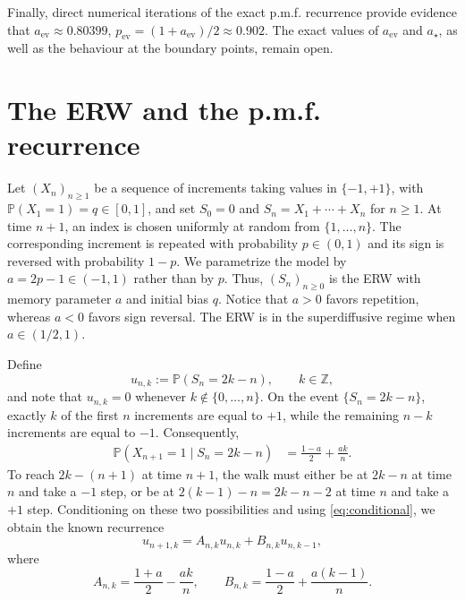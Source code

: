 \documentclass[11pt]{article}
\numberwithin{equation}{section}
\theoremstyle{remark}
\newcommand{\Pp}{\mathbb{P}}
\newcommand{\Z}{\mathbb{Z}}
\begin{document}
Finally, direct numerical iterations of the exact p.m.f. recurrence
provide evidence that $a_{\mathrm{ev}}\approx0.80399$, $p_{\mathrm{ev}}=(1+a_{\mathrm{ev}})/2\approx0.902$. The exact values of $a_{\mathrm{ev}}$ and $a_\star$, as well as the behaviour at the boundary points, remain open.

\section{The ERW and the p.m.f. recurrence}

Let $(X_n)_{n\geq1}$ be a sequence of increments taking values in $\{-1,+1\}$, with $\Pp(X_1=1)=q\in[0,1]$, 
and set $S_0=0$ and $S_n=X_1+\cdots+X_n$ for $n\geq1$. At time $n+1$, an index is chosen uniformly at random from $\{1,\ldots,n\}$. The corresponding increment is repeated with probability $p\in(0,1)$ and its sign is reversed with probability $1-p$. We parametrize the model by $a=2p-1\in(-1,1)$ rather than by $p$. Thus, $(S_n)_{n\geq0}$ is the ERW with memory parameter $a$ and initial bias $q$. Notice that $a>0$ favors repetition, whereas $a<0$ favors sign reversal. The ERW is in the superdiffusive regime when $a\in(1/2,1)$.


Define
\[
u_{n,k}:=\Pp(S_n=2k-n),\qquad k\in\Z,
\]
and note that $u_{n,k}=0$ whenever $k\notin\{0,\ldots,n\}$.
On the event $\{S_n=2k-n\}$, exactly $k$ of the first $n$
increments are equal to $+1$, while the remaining $n-k$ increments
are equal to $-1$. Consequently,
\begin{equation}\label{eq:conditional}
\begin{aligned}
\Pp(X_{n+1}=1\mid S_n=2k-n)
   &=\frac{1-a}{2}+\frac{ak}{n}.
\end{aligned}
\end{equation}
To reach $2k-(n+1)$ at time $n+1$, the walk must either be at
$2k-n$ at time $n$ and take a $-1$ step, or be at
$2(k-1)-n=2k-n-2$ at time $n$ and take a $+1$ step. Conditioning on these two possibilities and using \eqref{eq:conditional}, we obtain the known
recurrence
\begin{equation}\label{eq:massrec}
u_{n+1,k}
=
A_{n,k}u_{n,k}
+
B_{n,k}u_{n,k-1},
\end{equation}
where
\begin{equation}\label{eq:coefficients}
A_{n,k}
=
\frac{1+a}{2}-\frac{ak}{n},
\qquad
B_{n,k}
=
\frac{1-a}{2}+\frac{a(k-1)}{n}.
\end{equation}
\end{document}
